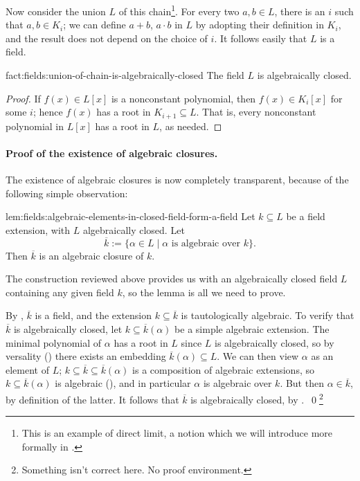 Now consider the union $L$ of this chain\footnote{This is an example
  of direct limit, a notion which we will introduce more formally in
  .}. For every two
$a, b \in L$, there is an $i$ such that $a, b \in K_i$; we can define
$a + b$, $a \cdot b$ in $L$ by adopting their definition in $K_i$, and
the result does not depend on the choice of $i$. It follows easily
that $L$ is a field.
\begin{fact}{}{fact:fields:union-of-chain-is-algebraically-closed}
  The field $L$ is algebraically closed.
\end{fact}
\begin{proof}
  If $f(x) \in L[x]$ is a nonconstant polynomial, then
  $f(x) \in K_i[x]$ for some $i$; hence $f(x)$ has a root in
  $K_{i+1} \subseteq L$. That is, every nonconstant polynomial in
  $L[x]$ has a root in $L$, as needed.
\end{proof}
\paragraph{Proof of the existence of algebraic closures.}
The existence of algebraic closures is now completely transparent,
because of the following simple observation:
\begin{lem}{}{lem:fields:algebraic-elements-in-closed-field-form-a-field}
  Let $k \subseteq L$ be a field extension, with $L$ algebraically
  closed.  Let
  \[
    \overline{k} := \{\alpha \in L \mid \alpha \text{ is algebraic
      over } k\}.
  \]
  Then $\overline{k}$ is an algebraic closure of $k$.
\end{lem}
The construction reviewed above provides us with an algebraically
closed field $L$ containing any given field $k$, so the lemma is all
we need to prove.

By , $\overline{k}$ is a field, and the
extension $k \subseteq \overline{k}$ is tautologically algebraic. To
verify that $\overline{k}$ is algebraically closed, let
$k \subseteq \overline{k}(\alpha)$ be a simple algebraic
extension. The minimal polynomial of $\alpha$ has a root in $L$ since
$L$ is algebraically closed, so by versality ()
there exists an embedding $\overline{k}(\alpha) \subseteq L$. We can
then view $\alpha$ as an element of $L$;
$k \subseteq \overline{k} \subseteq \overline{k}(\alpha)$ is a
composition of algebraic extensions, so
$k \subseteq \overline{k}(\alpha)$ is algebraic
(), and in particular $\alpha$ is algebraic
over $k$. But then $\alpha \in \overline{k}$, by definition of the
latter. It follows that $\overline{k}$ is algebraically closed, by
.\ \qed{}\footnote{Something isn't correct
  here. No proof environment.}

